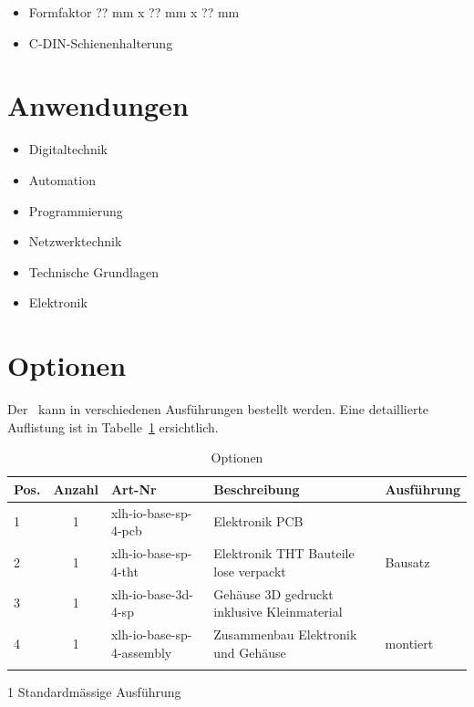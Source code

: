 \documentclass[10pt]{datasheet}
\begin{document}
\begin{itemize}
    \item Formfaktor ?? mm x ?? mm x ?? mm
    \item C-DIN-Schienenhalterung
\end{itemize}

\section{Anwendungen}

\begin{itemize}
    \item Digitaltechnik
    \item Automation
    \item Programmierung
    \item Netzwerktechnik
    \item Technische Grundlagen
    \item Elektronik
\end{itemize}

\vfill\break


\onecolumn

\section{Optionen}
Der \xlhPlattformID\ kann in verschiedenen Ausführungen bestellt werden.
Eine detaillierte Auflistung ist in Tabelle~\ref{tab:optionen} ersichtlich.

\begin{table}[h]
\begin{threeparttable}
\caption{Optionen \xlhPlattformID}
    \begin{tabularx}{\textwidth}{l | c | l | l | X}

        \thickhline
        \textbf{Pos.} & \textbf{Anzahl} & \textbf{Art-Nr} & \textbf{Beschreibung} & \textbf{Ausführung} \\
        \hline
        1 & 1 & xlh-io-base-sp-4-pcb & Elektronik PCB & \multirow{3}{*}{Bausatz\tnote{1}}  \\
        2 & 1 & xlh-io-base-sp-4-tht & Elektronik THT Bauteile lose verpackt &  \\
        3 & 1 & xlh-io-base-3d-4-sp & Gehäuse 3D gedruckt inklusive Kleinmaterial & \\
        \hline
        4 & 1 & xlh-io-base-sp-4-assembly & Zusammenbau Elektronik und Gehäuse & montiert \\
        \thickhline
    \end{tabularx}
\begin{tablenotes}
\item[1]{Standardmässige Ausführung}
\end{tablenotes}
\label{tab:optionen}
\end{threeparttable}
\end{table}
\end{document}
